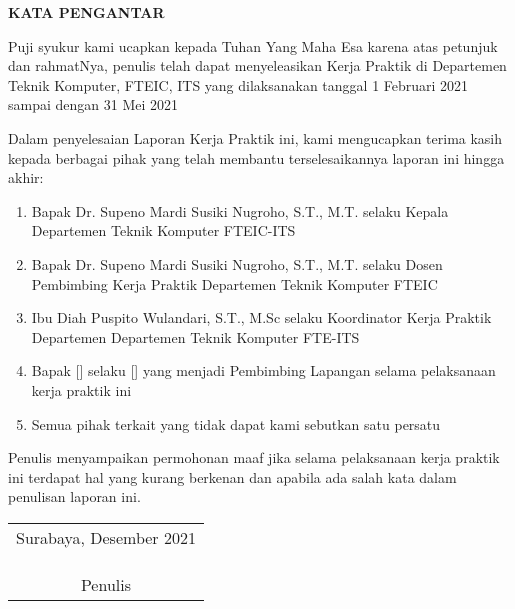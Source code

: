 \begin{center}
  \Large\textbf{KATA PENGANTAR}
\end{center}
\vspace{2ex}



Puji syukur kami ucapkan kepada Tuhan Yang Maha Esa karena atas petunjuk dan rahmatNya, penulis telah dapat menyeleasikan Kerja Praktik di Departemen Teknik Komputer, FTEIC, ITS yang dilaksanakan tanggal 1 Februari 2021 sampai dengan 31 Mei 2021


Dalam penyelesaian Laporan Kerja Praktik ini, kami mengucapkan terima kasih kepada berbagai pihak yang telah membantu terselesaikannya laporan ini hingga akhir:

\begin{enumerate}[nolistsep]

  \item Bapak Dr. Supeno Mardi Susiki Nugroho, S.T., M.T. selaku Kepala Departemen Teknik Komputer FTEIC-ITS 
  
  \item Bapak Dr. Supeno Mardi Susiki Nugroho, S.T., M.T. selaku Dosen Pembimbing Kerja Praktik Departemen Teknik Komputer FTEIC 

  \item Ibu Diah Puspito Wulandari, S.T., M.Sc selaku Koordinator Kerja Praktik Departemen Departemen Teknik Komputer FTE-ITS 
  
  \item Bapak [] selaku [] yang menjadi Pembimbing Lapangan selama pelaksanaan kerja praktik ini
  
  \item Semua pihak terkait yang tidak dapat kami sebutkan satu persatu

\end{enumerate}

Penulis menyampaikan permohonan maaf jika selama pelaksanaan kerja praktik ini terdapat hal yang kurang berkenan dan apabila ada salah kata dalam penulisan laporan ini. 

\begin{flushright}
  \begin{tabular}[b]{c}
    Surabaya, Desember 2021
    \\
    \\
    \\
    \\
    Penulis
  \end{tabular}
\end{flushright}
